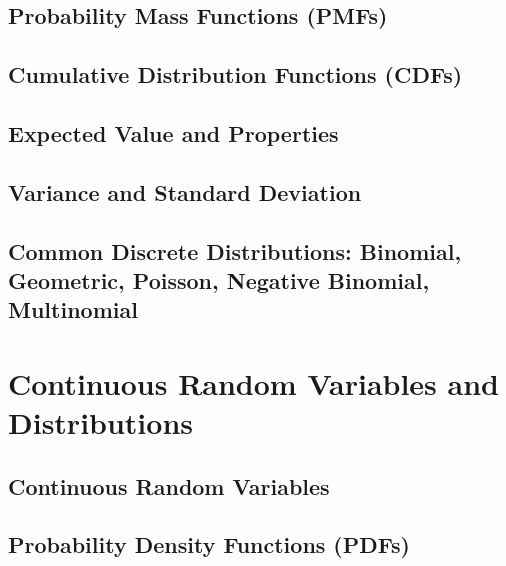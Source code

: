 \documentclass[
  12pt,
]{krantzNoCorner}
\begin{document}
\hypertarget{probability-mass-functions-pmfs}{%
\section{Probability Mass Functions (PMFs)}\label{probability-mass-functions-pmfs}}

\hypertarget{cumulative-distribution-functions-cdfs}{%
\section{Cumulative Distribution Functions (CDFs)}\label{cumulative-distribution-functions-cdfs}}

\hypertarget{expected-value-and-properties}{%
\section{Expected Value and Properties}\label{expected-value-and-properties}}

\hypertarget{variance-and-standard-deviation}{%
\section{Variance and Standard Deviation}\label{variance-and-standard-deviation}}

\hypertarget{common-discrete-distributions-binomial-geometric-poisson-negative-binomial-multinomial}{%
\section{Common Discrete Distributions: Binomial, Geometric, Poisson, Negative Binomial, Multinomial}\label{common-discrete-distributions-binomial-geometric-poisson-negative-binomial-multinomial}}

\hypertarget{continuous-random-variables-and-distributions}{%
\chapter{Continuous Random Variables and Distributions}\label{continuous-random-variables-and-distributions}}

\hypertarget{continuous-random-variables}{%
\section{Continuous Random Variables}\label{continuous-random-variables}}

\hypertarget{probability-density-functions-pdfs}{%
\section{Probability Density Functions (PDFs)}\label{probability-density-functions-pdfs}}
\end{document}
